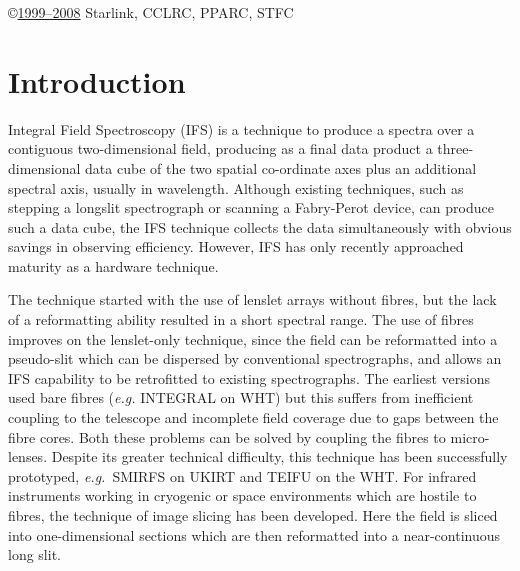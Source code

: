 \documentclass[twoside,11pt]{article}
\newcommand{\stardocinitials}  {SC}
\newcommand{\stardocnumber}    {16.2}
\newcommand{\stardocname}{\stardocinitials /\stardocnumber}
\newenvironment{latexonly}{}{}
\newcommand{\latex}[1]{#1}
\newcommand{\xlabel}[1]{}
\newcommand{\latexonlytoc}[0]{\tableofcontents}
\renewcommand{\thepage}{\roman{page}}
\begin{document}
 \vspace{10cm}
 \copyright \underline{1999--2008} Starlink, CCLRC, PPARC, STFC

 \begin{latexonly}
   \cleardoublepage
   \setlength{\parskip}{0mm}
   \latexonlytoc

   \newpage
   \listoffigures

   \setlength{\parskip}{\medskipamount}
   \markright{\stardocname}
 \end{latexonly}

\latex{\cleardoublepage}
\newpage
\renewcommand{\thepage}{\arabic{page}}
\setcounter{page}{1}


\section{\xlabel{sc16_intro}Introduction\label{sc16_intro}}

Integral Field Spectroscopy (IFS) is a technique to produce a spectra
over a contiguous two-dimensional field, producing as a final data
product a three-dimensional data cube of the two spatial co-ordinate
axes plus an additional spectral axis, usually in wavelength.  Although
existing techniques, such as stepping a longslit spectrograph or
scanning a Fabry-Perot device, can produce such a data cube, the IFS
technique collects the data simultaneously with obvious savings in
observing efficiency.  However, IFS has only recently approached
maturity as a hardware technique.

The technique started with the use of lenslet arrays without fibres,
but the lack of a reformatting ability resulted in a short spectral
range.  The use of fibres improves on the lenslet-only technique, since
the field can be reformatted into a pseudo-slit which can be
dispersed by conventional spectrographs, and allows an IFS capability
to be retrofitted to existing spectrographs.  The earliest versions
used bare fibres (\emph{e.g.} INTEGRAL on WHT) but this suffers from
inefficient coupling to the telescope and incomplete field coverage
due to gaps between the fibre cores.  Both these problems can be solved
by coupling the fibres to micro-lenses.  Despite its greater technical
difficulty, this technique has been successfully prototyped, \emph{e.g.}\
SMIRFS on UKIRT and TEIFU on the WHT.  For infrared instruments working
in cryogenic or space environments which are hostile to fibres, the
technique of image slicing has been developed.  Here the field is
sliced into one-dimensional sections which are then reformatted into a
near-continuous long slit.
\end{document}

